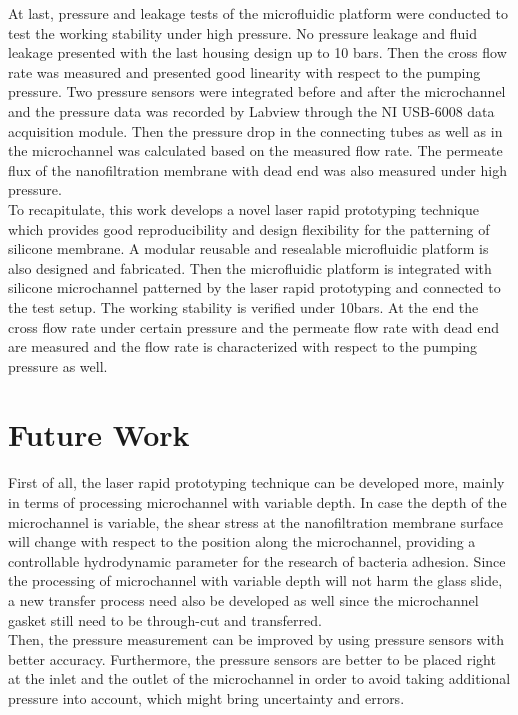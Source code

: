 At last, pressure and leakage tests of the microfluidic platform were conducted to test the working stability under high pressure. No pressure leakage and fluid leakage presented with the last housing design up to 10 bars. Then the cross flow rate was measured and presented good linearity with respect to the pumping pressure. Two pressure sensors were integrated before and after the microchannel and the pressure data was recorded by Labview through the NI USB-6008 data acquisition module. Then the pressure drop in the connecting tubes as well as in the microchannel was calculated based on the measured flow rate. The permeate flux of the nanofiltration membrane with dead end was also measured under high pressure.\\

To recapitulate, this work develops a novel laser rapid prototyping technique which provides good reproducibility and design flexibility for the patterning of silicone membrane. A modular reusable and resealable microfluidic platform is also designed and fabricated. Then the microfluidic platform is integrated with silicone microchannel patterned by the laser rapid prototyping and connected to the test setup. The working stability is verified under 10bars. At the end the cross flow rate under certain pressure and the permeate flow rate with dead end are measured and the flow rate is characterized with respect to the pumping pressure as well.

\section{Future Work}
\label{5_2}
First of all, the laser rapid prototyping technique can be developed more, mainly in terms of processing microchannel with variable depth. In case the depth of the microchannel is variable, the shear stress at the nanofiltration membrane surface will change with respect to the position along the microchannel, providing a controllable hydrodynamic parameter for the research of bacteria adhesion. Since the processing of microchannel with variable depth will not harm the glass slide, a new transfer process need also be developed as well since the microchannel gasket still need to be through-cut and transferred.\\

Then, the pressure measurement can be improved by using pressure sensors with better accuracy. Furthermore, the pressure sensors are better to be placed right at the inlet and the outlet of the microchannel in order to avoid taking additional pressure into account, which might bring uncertainty and errors. \\

